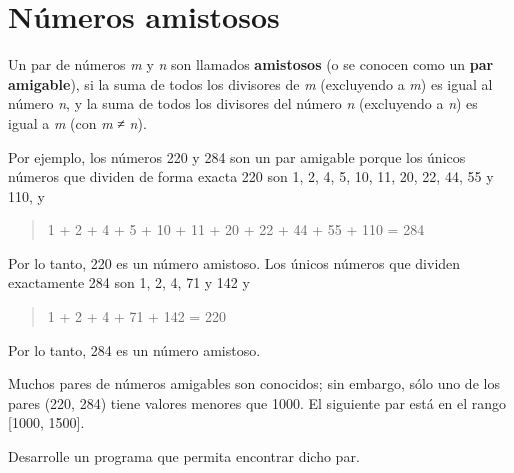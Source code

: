 \section{Números amistosos}

Un par de números \emph{m} y \emph{n} son llamados \textbf{amistosos} (o
se conocen como un \textbf{par amigable}), si la suma de todos los
divisores de \emph{m} (excluyendo a \emph{m}) es igual al número
\emph{n}, y la suma de todos los divisores del número \emph{n}
(excluyendo a \emph{n}) es igual a \emph{m} (con \emph{m} ≠ \emph{n}).

Por ejemplo, los números 220 y 284 son un par amigable porque los únicos
números que dividen de forma exacta 220 son 1, 2, 4, 5, 10, 11, 20, 22,
44, 55 y 110, y

\begin{quote}
1 + 2 + 4 + 5 + 10 + 11 + 20 + 22 + 44 + 55 + 110 = 284
\end{quote}

Por lo tanto, 220 es un número amistoso. Los únicos números que dividen
exactamente 284 son 1, 2, 4, 71 y 142 y

\begin{quote}
1 + 2 + 4 + 71 + 142 = 220
\end{quote}

Por lo tanto, 284 es un número amistoso.

Muchos pares de números amigables son conocidos; sin embargo, sólo uno
de los pares (220, 284) tiene valores menores que 1000. El siguiente par
está en el rango {[}1000, 1500{]}.

Desarrolle un programa que permita encontrar dicho par.
